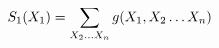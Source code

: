 \documentclass[preview]{standalone}
\begin{document}
\begin{align*}
\special{dvisvgm:raw <g id='unique000'>}S_1(X_1) = \sum_{X_2\ldots X_n} g(X_1, X_2\ldots X_n)\special{dvisvgm:raw </g>}
\end{align*}
\end{document}
